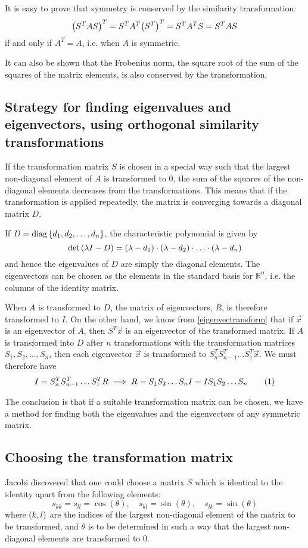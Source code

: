 \documentclass[12pt,english,a4paper]{report}
\newcommand{\R}{\mathbb{R}}
\newcommand{\eqtag}[1]{\refstepcounter{equation}\tag{\theequation}\label{#1}}
\begin{document}
It is easy to prove that symmetry is conserved by the similarity transformation:
\[
\qty(S^TAS)^T = S^TA^T\qty(S^T)^T = S^TA^TS = S^TAS
\]
if and only if \(A^T=A\), i.e. when \(A\) is symmetric.

It can also be shown that the Frobenius norm, the square root of the sum of the squares of the matrix elements, is also conserved by the transformation\autocite{compphys}.

\subsection{Strategy for finding eigenvalues and eigenvectors, using orthogonal similarity transformations}
If the transformation matrix \(S\) is chosen in a special way such that the largest non-diagonal element of \(A\) is transformed to \(0\), the sum of the squares of the non-diagonal elements decreases from the transformations. This means that if the transformation is applied repeatedly, the matrix is converging towards a diagonal matrix \(D\).

If \(D=\operatorname{diag}\qty{d_1,d_2,\dots,d_n}\), the characteristic polynomial is given by
\[
\operatorname{det}\qty(\lambda I - D) = \qty(\lambda-d_1)\cdot\qty(\lambda-d_2)\cdot\ldots\cdot\qty(\lambda-d_n)
\]
and hence the eigenvalues of \(D\) are simply the diagonal elements. The eigenvectors can be chosen as the elements in the standard basis for \(\R^n\), i.e. the columns of the identity matrix.

When \(A\) is transformed to \(D\), the matrix of eigenvectors, \(R\), is therefore transformed to \(I\). On the other hand, we know from \vref{eigenvectransform} that if \(\vec{x}\) is an eigenvector of \(A\), then \(S^T\vec{x}\) is an eigenvector of the transformed matrix. If \(A\) is transformed into \(D\) after \(n\) transformations with the transformation matrices \(S_1,S_2,\dots,S_n\), then each eigenvector \(\vec{x}\) is transformed to \(S_n^TS_{n-1}^T\dots S_1^T\vec{x}\). We must therefore have
\[
I = S_n^TS_{n-1}^T\dots S_1^TR \implies R = S_1S_2\dots S_nI = IS_1S_2\dots S_n \eqtag{findR}
\]

The conclusion is that if a suitable transformation matrix can be chosen, we have a method for finding both the eigenvalues and the eigenvectors of any symmetric matrix.

\subsection{Choosing the transformation matrix}
Jacobi discovered that one could choose a matrix \(S\) which is identical to the identity apart from the following elements:
\[
s_{kk} = s_{ll} = \cos(\theta), \quad s_{kl} = \sin(\theta), \quad s_{lk} = \sin(\theta)
\]
where \(\qty(k,l)\) are the indices of the largest non-diagonal element of the matrix to be transformed, and \(\theta\) is to be determined in such a way that the largest non-diagonal elements are transformed to \(0\).
\end{document}
